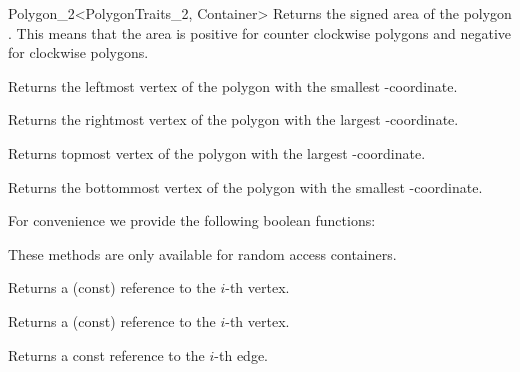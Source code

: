 \begin{ccRefClass}{Polygon_2<PolygonTraits_2, Container>}
    { Returns the signed area of the polygon \ccVar. This means that the area is
      positive for counter clockwise polygons and negative for clockwise polygons.
    }
      
    { Returns the leftmost vertex of the polygon  with the smallest
     -coordinate. }
    
    { Returns the rightmost vertex of the polygon  with the largest
     -coordinate. }
    
    { Returns topmost vertex of the polygon  with the largest
     -coordinate. }
    
    { Returns the bottommost vertex of the polygon  with the smallest
     -coordinate. }
    
For convenience we provide the following boolean functions:    

    {}

\ccGlue
{}
    {}

    {}

\ccGlue
{}
    {}

\ccGlue
{}
    {}

\ccGlue
{}
    {}
  
\ccGlue
{}
    {}

\ccGlue
{}
    {}

These methods are only available for random access containers.

    { Returns a (const) reference to the $i$-th vertex. }

    { Returns a (const) reference to the $i$-th vertex. }

    { Returns a const reference to the $i$-th edge. }


\end{ccRefClass}
